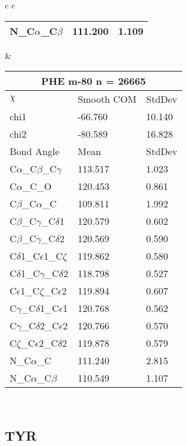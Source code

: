 \begin{longtable}{ c c }
\begin{tabular}{ l l l }
  N\_C$\alpha$\_C$\beta$ & 111.200 & 1.109\\
  \bottomrule
  \end{tabular}
  &
  \begin{tabular}{ l l l }
  \toprule
  \multicolumn{3}{c}{PHE \textbf{m-80} n = 26665} \\ \toprule
  $\chi$       & Smooth COM & StdDev \\ \midrule
  chi1 & -66.760 & 10.140 \\ 
  chi2 & -80.589 & 16.828 \\ \midrule
  Bond Angle   & Mean     & StdDev \\ \midrule
  C$\alpha$\_C$\beta$\_C$\gamma$ & 113.517 & 1.023\\
  C$\alpha$\_C\_O & 120.453 & 0.861\\
  C$\beta$\_C$\alpha$\_C & 109.811 & 1.992\\
  C$\beta$\_C$\gamma$\_C$\delta$1 & 120.579 & 0.602\\
  C$\beta$\_C$\gamma$\_C$\delta$2 & 120.569 & 0.590\\
  C$\delta$1\_C$\epsilon$1\_C$\zeta$ & 119.862 & 0.580\\
  C$\delta$1\_C$\gamma$\_C$\delta$2 & 118.798 & 0.527\\
  C$\epsilon$1\_C$\zeta$\_C$\epsilon$2 & 119.894 & 0.607\\
  C$\gamma$\_C$\delta$1\_C$\epsilon$1 & 120.768 & 0.562\\
  C$\gamma$\_C$\delta$2\_C$\epsilon$2 & 120.766 & 0.570\\
  C$\zeta$\_C$\epsilon$2\_C$\delta$2 & 119.878 & 0.579\\
  N\_C$\alpha$\_C & 111.240 & 2.815\\
  N\_C$\alpha$\_C$\beta$ & 110.549 & 1.107\\
  \bottomrule
  \end{tabular}
  \\
  
\end{longtable}    

\newpage
\subsection{TYR}

